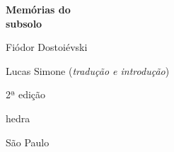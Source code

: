 




\begingroup\thispagestyle{empty}\vspace*{.05\textheight} 

              \formular
              \Huge
              \noindent
              \textbf{Memórias do\\subsolo}

              
              {\brabo\LARGE
              \noindent Fiódor Dostoiévski}
              
              \vfill

              \newfontfamily{}
              \fontsize{30}{40}\selectfont \minion\small
              \noindent Lucas Simone (\textit{tradução e introdução})
              
              \vspace{0.5cm}
              
              {\noindent\fontsize{30}{40}\selectfont \minion\small\noindent 2ª edição}

              \vfill
              
              \newfontfamily{}
              {\noindent\fontsize{30}{40}\selectfont\timesnewroman hedra}
              \smallskip
              
              {\selectfont\minion\small
              \noindent São Paulo \quad\the\year}

\endgroup
\pagebreak

